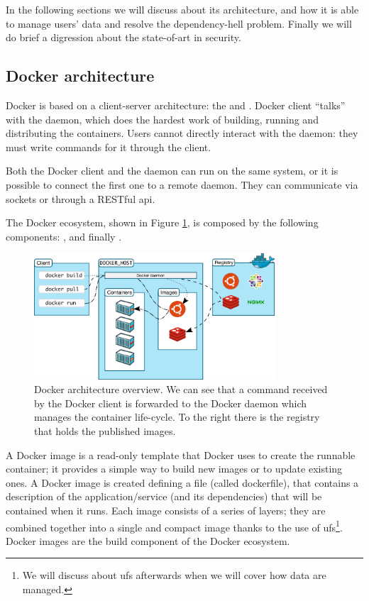In the following sections we will discuss about its architecture, and how it is able to manage users'
data and resolve the dependency-hell problem. Finally we will do brief a digression about the state-of-art
in security.

\subsection{Docker architecture}
\label{sec:problemSpace-docker-architecture}
Docker is based on a client-server architecture: the  and . Docker
client ``talks'' with the daemon, which does the hardest work of building, running and distributing
the containers. Users cannot directly interact with the daemon: they must write commands for it 
through the client.

Both the Docker client and the daemon can run on the same system, or it is possible to connect the
first one to a remote daemon. They can communicate via sockets or through a RESTful \acs{api}.

The Docker ecosystem, shown in Figure \ref{img:problemSpace-docker-architecture-architecture}, is
composed by the following components: ,  and finally
.

\begin{figure}
	\centering{}
	\includegraphics[width=0.8\textwidth]{chapters/problem/images/docker-architecture.png}
	\caption[Docker architecture overview]{Docker architecture overview. We can see that a command
		received by the Docker client is forwarded to the Docker daemon which manages the container
		life-cycle. To the right there is the registry that holds the published images.}
	\label{img:problemSpace-docker-architecture-architecture}
\end{figure}

A Docker image is a read-only template that Docker uses to create the runnable container; it provides
a simple way to build new images or to update existing ones. A Docker image is created defining a
file (called dockerfile), that contains a description of the application/service (and its dependencies)
that will be contained when it runs. Each image consists of a series of layers; they are combined together
into a single and compact image thanks to the use of \ac{ufs}\footnote{We will discuss about \ac{ufs}
afterwards when we will cover how data are managed.}. Docker images are the build component of the
Docker ecosystem.

